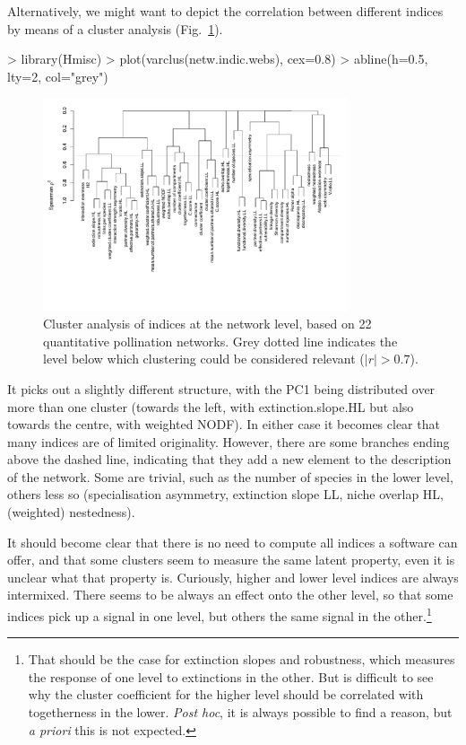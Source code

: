 \documentclass[a4paper, 11pt]{article}
\begin{document}
Alternatively, we might want to depict the correlation between different indices by means of a cluster analysis (Fig.~\ref{fig:clusternetworklevel}).
\begin{Schunk}
\begin{Sinput}
> library(Hmisc)
> plot(varclus(netw.indic.webs), cex=0.8)
> abline(h=0.5, lty=2, col="grey")
\end{Sinput}
\end{Schunk}
\begin{figure}
\centering
\includegraphics[width=0.8\textwidth]{figures/clusternetworklevel}
\caption{Cluster analysis of indices at the network level, based on 22 quantitative pollination networks. Grey dotted line indicates the level below which clustering could be considered relevant ($|r| > 0.7$).}
\label{fig:clusternetworklevel}
\end{figure}
%
It picks out a slightly different structure, with the PC1 being distributed over more than one cluster (towards the left, with extinction.slope.HL but also towards the centre, with weighted NODF). In either case it becomes clear that many indices are of limited originality. However, there are some branches ending above the dashed line, indicating that they add a new element to the description of the network. Some are trivial, such as the number of species in the lower level, others less so (specialisation asymmetry, extinction slope LL, niche overlap HL, (weighted) nestedness). 

It should become clear that there is no need to compute all indices a software can offer, and that some clusters seem to measure the same latent property, even it is unclear what that property is. Curiously, higher and lower level indices are always intermixed. There seems to be always an effect onto the other level, so that some indices pick up a signal in one level, but others the same signal in the other.\footnote{That should be the case for extinction slopes and robustness, which measures the response of one level to extinctions in the other. But is difficult to see why the cluster coefficient for the higher level should be correlated with togetherness in the lower. \emph{Post hoc}, it is always possible to find a reason, but \emph{a priori} this is not expected.}
\end{document}
